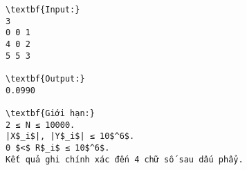 \begin{verbatim}
\textbf{Input:}
3
0 0 1
4 0 2
5 5 3

\textbf{Output:}
0.0990

\textbf{Giới hạn:}
2 ≤ N ≤ 10000. 
|X$_i$|, |Y$_i$| ≤ 10$^6$.
0 $<$ R$_i$ ≤ 10$^6$. 
Kết quả ghi chính xác đến 4 chữ số sau dấu phẩy.
\end{verbatim}